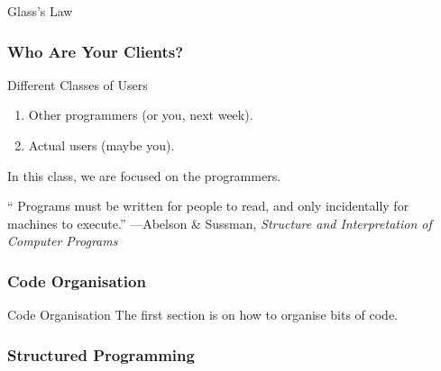 \begin{frame}[fragile]
Glass's Law 
\end{frame}

\begin{frame}[fragile]
\frametitle{Who Are Your Clients?}
\begin{block}{Different Classes of Users}
\begin{enumerate}
\item Other programmers (or you, next week).
\item Actual users (maybe you).
\end{enumerate}
\end{block}

In this class, we are focused on the programmers.
\end{frame}

\begin{frame}[fragile]

`` Programs must be written for people to read, and only incidentally for machines to execute.''
---Abelson \& Sussman, \textit{Structure and Interpretation of Computer Programs}

\end{frame}



\begin{frame}[fragile]
\frametitle{Code Organisation}

\begin{block}{Code Organisation}
The first section is on how to organise bits of code.
\end{block}
\end{frame}

\begin{frame}[fragile]
\frametitle{Structured Programming}
\end{frame}

